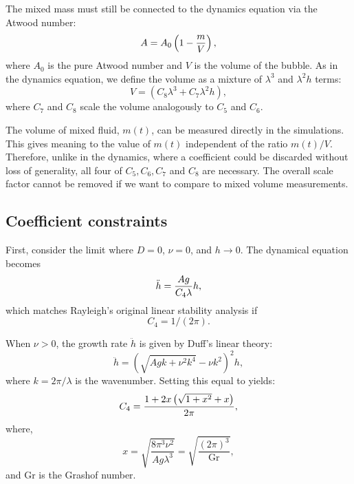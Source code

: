 The mixed mass must still be connected to the dynamics equation via the Atwood number:
\begin{equation} \elabel{effective-atwood}
A = A_0 \left( 1 - \frac{m}{V}\right),
\end{equation}
where $A_0$ is the pure Atwood number and
$V$ is the volume of the bubble.
As in the dynamics equation, we define the volume as a mixture of $\lambda^3$ and $\lambda^2 h$ terms:
\begin{equation}
V = \left(C_8 \lambda^3 + C_7 \lambda^2 h\right),
\end{equation}
where $C_7$ and $C_8$ scale the volume analogously to $C_5$ and $C_6$.

The volume of mixed fluid, $m(t)$, can be measured directly in the simulations.
This gives meaning to the value of $m(t)$ independent of the ratio $m(t)/V$.
Therefore, unlike in the dynamics, where a coefficient could be discarded without loss of generality, all four of $C_5, C_6, C_7$ and $C_8$ are necessary.
The overall scale factor cannot be removed if we want to compare to mixed volume measurements.

\subsection{Coefficient constraints}
First, consider the limit where $D = 0$, $\nu = 0$, and $h \rightarrow 0$.
The dynamical equation becomes
\begin{equation} \elabel{first_constraint}
\ddot{h} = \frac{A g }{C_4 \lambda} h,
\end{equation}
which matches Rayleigh's original linear stability analysis if 
\begin{equation} 
C_4 = 1/(2 \pi).
\end{equation}

When $\nu > 0$, the growth rate $\ddot{h}$ is given by Duff's linear theory:
\begin{equation}
\ddot{h} = \left(\sqrt{A g k + \nu^2 k^4} - \nu k^2\right)^2 h,
\end{equation}
where $k = 2\pi / \lambda$ is the wavenumber.
Setting this equal to  yields:
\begin{equation} \elabel{c4}
C_4 = \frac{1 + 2x\left(\sqrt{1 + x^2} + x\right)}{2\pi},
\end{equation}
where,
\begin{equation}
x = \sqrt{\frac{8 \pi^3 \nu^2}{A g \lambda^3}} = \sqrt{\frac{(2 \pi)^3}{\text{Gr}}},
\end{equation}
and Gr is the Grashof number.

